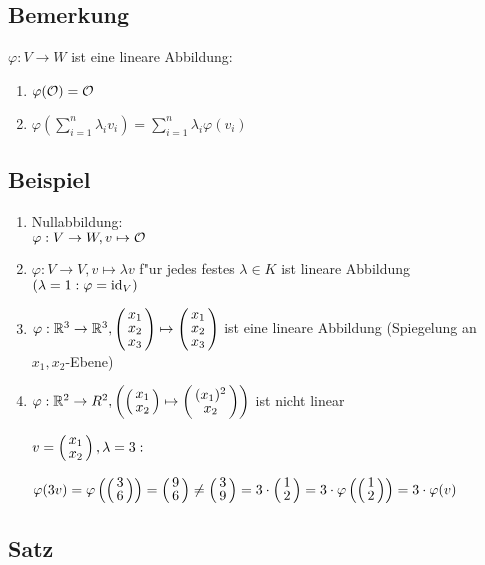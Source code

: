 \subsection{Bemerkung}
$\varphi: V \rightarrow W$ ist eine lineare Abbildung:
\begin{enumerate}
	\item
	$\varphi( \mathcal{O}) = \mathcal{O}$
	\item
	$\varphi \left(\sum_{i=1}^{n} \lambda_i v_i \right) = \sum_{i=1}^{n} \lambda_i \varphi(v_i)$ 
\end{enumerate}
\subsection{Beispiel}
\begin{enumerate}
	\item
	Nullabbildung:\\
	$\varphi: V \rightarrow W, v \mapsto \mathcal{O}$
	\item
	$\varphi : V \rightarrow V, v \mapsto \lambda v$ f"ur jedes festes $\lambda \in K$ ist lineare Abbildung $(\lambda = 1: \varphi = \mathrm{ id }_V )$
	\item
	$\varphi : \R^3 \rightarrow \R^3, \vct{x_1\\ x_2\\ x_3}\mapsto \vct{x_1 \\ x_2 \\ x_3}$ ist eine lineare Abbildung (Spiegelung an $x_1, x_2$-Ebene) 
	\item
	$\varphi : \R^ 2 \rightarrow R^2, \left(	\vct{x_1 \\ x_2} \mapsto \vct{(x_1)^2 \\ x_2 }\right)$ ist nicht linear
	
	$v= \vct{x_1 \\ x_2}, \lambda =3:$
	
	 $\varphi(3v)= \varphi\left(\vct{3 \\ 6}\right)=  \vct{9 \\ 6} \neq \vct{3 \\ 9} = 3 \cdot \vct{1\\2}= 3 \cdot \varphi \left(\vct{1\\2} \right) = 3 \cdot \varphi(v)$
	 \\

\end{enumerate}

\subsection{Satz}
\label{linAbb}

